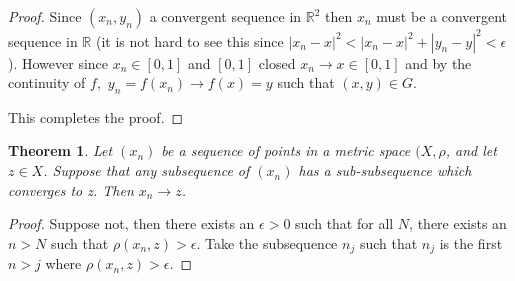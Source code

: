 \documentclass[letter]{article}
\newtheorem{theorem}{Theorem}
\newenvironment{menumerate}{%
  \edef\backupindent{\the\parindent}%
  \enumerate%
  \setlength{\parindent}{\backupindent}%
}{\endenumerate}
\begin{document}
\begin{menumerate}
\begin{proof}
	   		Since $(x_n, y_n)$ a convergent sequence in $\mathbb{R}^2$ then $x_n$ must be a convergent sequence in $\mathbb{R}$ (it is not hard to see this since $|x_n -x|^2 < |x_n -x|^2 + |y_n - y|^2 < \epsilon$). However since $x_n \in [0,1]$ and $[0,1]$ closed $x_n \to x \in [0,1]$ and by the continuity of $f,$ $y_n = f(x_n) \to f(x) = y$ such that $(x,y) \in G.$
	   		
	   		This completes the proof.
	   	\end{proof}
	   	\item 
	   	\begin{theorem}
	   	Let $(x_n)$ be a sequence of points in a metric space $(X, \rho$, and let $z \in X$. Suppose that any subsequence of $(x_n)$ has a sub-subsequence which converges to z. Then $x_n \to z$.
	   	\end{theorem}
	   	\begin{proof}
	   	Suppose not, then there exists an $\epsilon > 0$ such that for all $N$, there exists an $n >N$ such that $\rho(x_n, z) > \epsilon.$ Take the subsequence $n_j$ such that $n_j$ is the first $n > j$ where $\rho(x_n, z) > \epsilon.$


\end{proof}
\end{menumerate}
\end{document}
